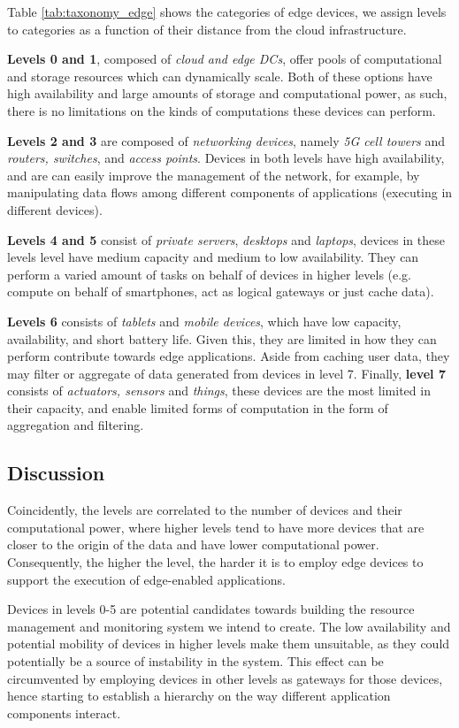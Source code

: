 Table \ref{tab:taxonomy_edge} shows the categories of edge devices, we assign levels to categories as a function of their distance from the cloud infrastructure. 

\textbf{Levels 0 and 1}, composed of \textit{cloud and edge DCs}, offer pools of computational and storage resources which can dynamically scale. Both of these options have high availability and large amounts of storage and computational power, as such, there is no limitations on the kinds of computations these devices can perform.

\textbf{Levels 2 and 3} are composed of \textit{networking devices}, namely 
\textit{5G cell towers} and \textit{routers, switches}, and \textit{access points}. Devices in both levels have high availability, and are can easily improve the management of the network, for example, by manipulating data flows among different components of applications (executing in different devices).

\textbf{Levels 4 and  5} consist of \textit{private servers}, \textit{desktops} and \textit{laptops}, devices in these levels level have medium capacity and medium to low availability. They can perform a varied amount of tasks on behalf of devices in higher levels (e.g. compute on behalf of smartphones, act as logical gateways or just cache data). 

\textbf{Levels 6} consists of \textit{tablets} and \textit{mobile devices}, which have low capacity, availability, and short battery life. Given this, they are limited in how they can perform contribute towards edge applications. Aside from caching user data, they may filter or aggregate of data generated from devices in level 7. Finally, \textbf{level 7} consists of \textit{actuators, sensors} and \textit{things}, these devices are the most limited in their capacity, and enable limited forms of computation in the form of aggregation and filtering.

\subsection{Discussion}

Coincidently, the levels are correlated to the number of devices and their computational power, where higher levels tend to have more devices that are closer to the origin of the data and have lower computational power. Consequently, the higher the level, the harder it is to employ edge devices to support the execution of edge-enabled applications. 

Devices in levels 0-5 are potential candidates towards building the resource management and monitoring system we intend to create. The low availability and potential mobility of devices in higher levels make them unsuitable, as they could potentially be a source of instability in the system. This effect can be circumvented by employing devices in other levels as gateways for those devices, hence starting to establish a hierarchy on the way different application components interact.
